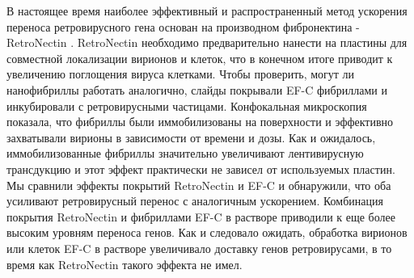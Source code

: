     
    
    
    В настоящее время наиболее эффективный и распространенный метод ускорения переноса ретровирусного гена основан на производном фибронектина - RetroNectin \cite{hanenberg_colocalization_1996,hanenberg_optimization_1997,pollok_high-efficiency_1998}. RetroNectin необходимо предварительно нанести на пластины для совместной локализации вирионов и клеток, что в конечном итоге приводит к увеличению поглощения вируса клетками. Чтобы проверить, могут ли нанофибриллы работать аналогично, слайды покрывали EF-C фибриллами и инкубировали с ретровирусными частицами. Конфокальная микроскопия показала, что фибриллы были иммобилизованы на поверхности и эффективно захватывали вирионы в зависимости от времени и дозы. Как и ожидалось, иммобилизованные фибриллы значительно увеличивают лентивирусную трансдукцию и этот эффект практически не зависел от используемых пластин. Мы сравнили эффекты покрытий RetroNectin и EF-C и обнаружили, что оба усиливают ретровирусный перенос с аналогичным ускорением. Комбинация покрытия RetroNectin и фибриллами EF-C в растворе приводили к еще более высоким уровням переноса генов. Как и следовало ожидать, обработка вирионов или клеток EF-C в растворе увеличивало доставку генов ретровирусами, в то время как RetroNectin такого эффекта не имел.
    
